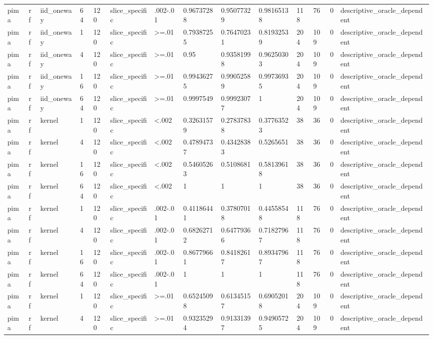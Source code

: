 \begin{tabular}{llllllllllllll}
pima & rf & iid\_oneway & 64 & 120 & slice\_specific & .002-.01 & 0.96737288 & 0.95077329 & 0.98165138 & 118 & 76 & 0 & descriptive\_oracle\_dependent \\
pima & rf & iid\_oneway & 1 & 120 & slice\_specific & >=.01 & 0.79387255 & 0.76470231 & 0.81932539 & 204 & 109 & 0 & descriptive\_oracle\_dependent \\
pima & rf & iid\_oneway & 4 & 120 & slice\_specific & >=.01 & 0.95 & 0.93581998 & 0.96250303 & 204 & 109 & 0 & descriptive\_oracle\_dependent \\
pima & rf & iid\_oneway & 16 & 120 & slice\_specific & >=.01 & 0.99436275 & 0.99052589 & 0.99736935 & 204 & 109 & 0 & descriptive\_oracle\_dependent \\
pima & rf & iid\_oneway & 64 & 120 & slice\_specific & >=.01 & 0.9997549 & 0.99923077 & 1 & 204 & 109 & 0 & descriptive\_oracle\_dependent \\
pima & rf & kernel & 1 & 120 & slice\_specific & <.002 & 0.32631579 & 0.27837838 & 0.37763523 & 38 & 36 & 0 & descriptive\_oracle\_dependent \\
pima & rf & kernel & 4 & 120 & slice\_specific & <.002 & 0.47894737 & 0.43428383 & 0.5265651 & 38 & 36 & 0 & descriptive\_oracle\_dependent \\
pima & rf & kernel & 16 & 120 & slice\_specific & <.002 & 0.54605263 & 0.5108681 & 0.58139618 & 38 & 36 & 0 & descriptive\_oracle\_dependent \\
pima & rf & kernel & 64 & 120 & slice\_specific & <.002 & 1 & 1 & 1 & 38 & 36 & 0 & descriptive\_oracle\_dependent \\
pima & rf & kernel & 1 & 120 & slice\_specific & .002-.01 & 0.41186441 & 0.37807018 & 0.44558548 & 118 & 76 & 0 & descriptive\_oracle\_dependent \\
pima & rf & kernel & 4 & 120 & slice\_specific & .002-.01 & 0.68262712 & 0.64779366 & 0.71827967 & 118 & 76 & 0 & descriptive\_oracle\_dependent \\
pima & rf & kernel & 16 & 120 & slice\_specific & .002-.01 & 0.86779661 & 0.84182617 & 0.89347967 & 118 & 76 & 0 & descriptive\_oracle\_dependent \\
pima & rf & kernel & 64 & 120 & slice\_specific & .002-.01 & 1 & 1 & 1 & 118 & 76 & 0 & descriptive\_oracle\_dependent \\
pima & rf & kernel & 1 & 120 & slice\_specific & >=.01 & 0.65245098 & 0.61345157 & 0.69052018 & 204 & 109 & 0 & descriptive\_oracle\_dependent \\
pima & rf & kernel & 4 & 120 & slice\_specific & >=.01 & 0.93235294 & 0.91331397 & 0.94905725 & 204 & 109 & 0 & descriptive\_oracle\_dependent \\

\end{tabular}
